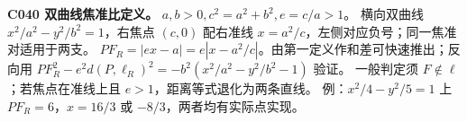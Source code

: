 \textbf{C040 双曲线焦准比定义。} $a,b>0,c^2=a^2+b^2,e=c/a>1$。
横向双曲线 $x^2/a^2-y^2/b^2=1$，右焦点 $(c,0)$ 配右准线 $x=a^2/c$，左侧对应负号；同一焦准对适用于两支。
$PF_R=|ex-a|=e|x-a^2/c|$。由第一定义作和差可快速推出；反向用
$PF_R^2-e^2d(P,\ell_R)^2=-b^2(x^2/a^2-y^2/b^2-1)$ 验证。
一般判定须 $F\notin\ell$；若焦点在准线上且 $e>1$，距离等式退化为两条直线。
例：$x^2/4-y^2/5=1$ 上 $PF_R=6$，$x=16/3$ 或 $-8/3$，两者均有实际点实现。
